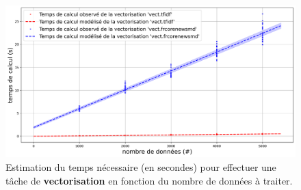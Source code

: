 			\begin{figure}[H]
				\centering
				\includegraphics[width=\textwidth]{figures/etude-temps-calcul-modelisation-2vect}
				\caption{Estimation du temps nécessaire (en secondes) pour effectuer une tâche de \textbf{vectorisation} en fonction du nombre de données à traiter.}
				\label{figure:4.3.1-ETUDE-COUTS-TEMPS-CALCUL-MODELISATION-VECTORIZATION}
			\end{figure}
			
			
